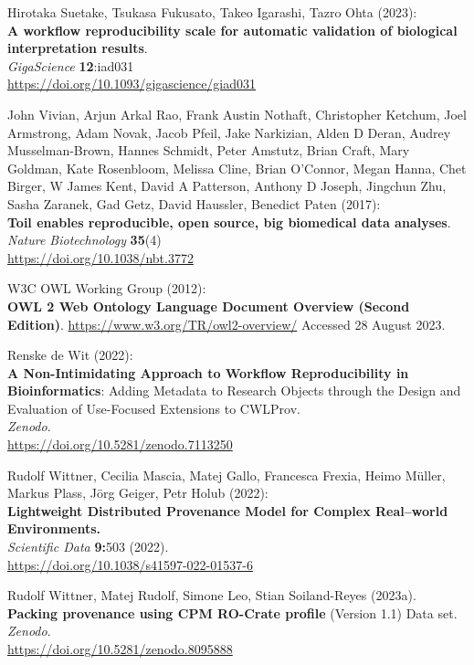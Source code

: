 \documentclass[10pt,letterpaper]{article}
\begin{document}
\begin{thebibliography}{10}
\begin{small}
 Hirotaka Suetake, Tsukasa Fukusato, Takeo Igarashi, Tazro Ohta (2023):\\
\textbf{A workflow reproducibility scale for automatic validation of biological interpretation results}.\\
\emph{GigaScience} \textbf{12}:iad031\\
\url{https://doi.org/10.1093/gigascience/giad031}

John Vivian, Arjun Arkal Rao, Frank Austin Nothaft, Christopher Ketchum, Joel Armstrong, Adam Novak, Jacob Pfeil, Jake Narkizian, Alden D Deran, Audrey Musselman-Brown, Hannes Schmidt, Peter Amstutz, Brian Craft, Mary Goldman, Kate Rosenbloom, Melissa Cline, Brian O'Connor, Megan Hanna, Chet Birger, W James Kent, David A Patterson, Anthony D Joseph, Jingchun Zhu, Sasha Zaranek, Gad Getz, David Haussler, Benedict Paten (2017):\\
\textbf{Toil enables reproducible, open source, big biomedical data analyses}.\\
\emph{Nature Biotechnology} \textbf{35}(4)\\
\url{https://doi.org/10.1038/nbt.3772}

W3C OWL Working Group (2012):\\
\textbf{OWL 2 Web Ontology Language Document Overview (Second Edition)}.
\url{https://www.w3.org/TR/owl2-overview/}
Accessed 28 August 2023.

Renske de Wit (2022):\\
\textbf{A Non-Intimidating Approach to Workflow Reproducibility in Bioinformatics}: Adding Metadata to Research Objects through the Design and Evaluation of Use-Focused Extensions to CWLProv.\\
\emph{Zenodo}.\\
\url{https://doi.org/10.5281/zenodo.7113250}

Rudolf Wittner, Cecilia Mascia, Matej Gallo, Francesca Frexia, Heimo Müller, Markus Plass, Jörg Geiger, Petr Holub (2022):\\
\textbf{Lightweight Distributed Provenance Model for Complex Real--world
Environments.\\
}\emph{Scientific Data} \textbf{9:}503 (2022).\\
\url{https://doi.org/10.1038/s41597-022-01537-6}

 Rudolf Wittner, Matej Rudolf, Simone Leo, Stian Soiland-Reyes (2023a).\\
\textbf{Packing provenance using CPM RO-Crate profile} (Version 1.1)
Data set.\\
\emph{Zenodo}.\\
\url{https://doi.org/10.5281/zenodo.8095888}


\end{small}
\end{thebibliography}
\end{document}
